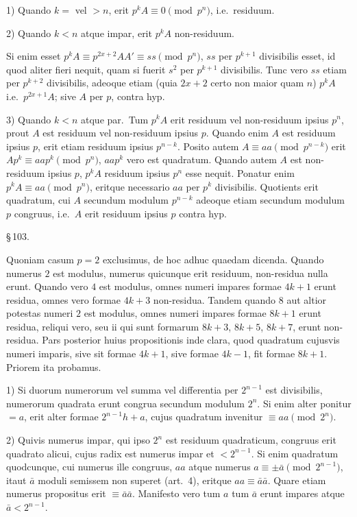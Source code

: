 \documentclass[12pt,a4paper]{article}
\theoremstyle{plain}
\theoremstyle{definition}
\theoremstyle{remark}
\begin{document}
1) Quando $k = $ vel $> n$, erit $p^k A \equiv 0 \pmod{p^n}$, i.e.\ residuum.

2) Quando $k < n$ atque impar, erit $p^k A$ non-residuum.

Si enim esset $p^k A \equiv p^{2x+2} AA' \equiv ss \pmod{p^n}$, $ss$ per $p^{k+1}$ divisibilis esset, id quod aliter fieri nequit, quam si fuerit $s^2$ per $p^{k+1}$ divisibilis. Tunc vero $ss$ etiam per $p^{k+2}$ divisibilis, adeoque etiam (quia $2x+2$ certo non maior quam $n$) $p^k A$ i.e.\ $p^{2x+1}A$; sive $A$ per $p$, contra hyp.

3) Quando $k < n$ atque par.\ Tum $p^k A$ erit residuum vel non-residuum ipsius $p^n$, prout $A$ est residuum vel non-residuum ipsius $p$. Quando enim $A$ est residuum ipsius $p$, erit etiam residuum ipsius $p^{n-k}$. Posito autem $A \equiv aa \pmod{p^{n-k}}$ erit $Ap^k \equiv aap^k \pmod{p^n}$, $aap^k$ vero est quadratum. Quando autem $A$ est non-residuum ipsius $p$, $p^k A$ residuum ipsius $p^n$ esse nequit. Ponatur enim $p^k A \equiv aa \pmod{p^n}$, eritque necessario $aa$ per $p^k$ divisibilis. Quotients erit quadratum, cui $A$ secundum modulum $p^{n-k}$ adeoque etiam secundum modulum $p$ congruus, i.e.\ $A$ erit residuum ipsius $p$ contra hyp.

\begin{center}\S\,103.\end{center}

Quoniam casum $p = 2$ exclusimus, de hoc adhuc quaedam dicenda. Quando numerus $2$ est modulus, numerus quicunque erit residuum, non-residua nulla erunt. Quando vero $4$ est modulus, omnes numeri impares formae $4k+1$ erunt residua, omnes vero formae $4k+3$ non-residua. Tandem quando $8$ aut altior potestas numeri $2$ est modulus, omnes numeri impares formae $8k+1$ erunt residua, reliqui vero, seu ii qui sunt formarum $8k+3$, $8k+5$, $8k+7$, erunt non-residua. Pars posterior huius propositionis inde clara, quod quadratum cujusvis numeri imparis, sive sit formae $4k+1$, sive formae $4k-1$, fit formae $8k+1$. Priorem ita probamus.

1) Si duorum numerorum vel summa vel differentia per $2^{n-1}$ est divisibilis, numerorum quadrata erunt congrua secundum modulum $2^n$. Si enim alter ponitur $= a$, erit alter formae $2^{n-1}h + a$, cujus quadratum invenitur $\equiv aa \pmod{2^n}$.

2) Quivis numerus impar, qui ipso $2^n$ est residuum quadraticum, congruus erit quadrato alicui, cujus radix est numerus impar et $< 2^{n-1}$. Si enim quadratum quodcunque, cui numerus ille congruus, $aa$ atque numerus $a \equiv \pm \bar{a} \pmod{2^{n-1}}$, itaut $\bar{a}$ moduli semissem non superet (art.~4), eritque $aa \equiv \bar{a}\bar{a}$. Quare etiam numerus propositus erit $\equiv \bar{a}\bar{a}$. Manifesto vero tum $a$ tum $\bar{a}$ erunt impares atque $\bar{a} < 2^{n-1}$.
\end{document}
